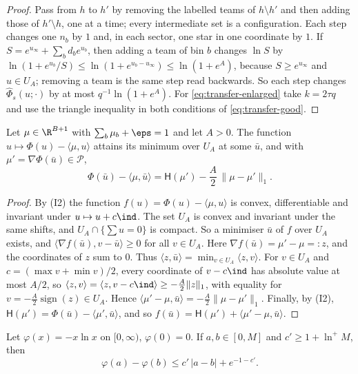 \begin{proof}
Pass from $h$ to $h'$ by removing the labelled teams of $h\setminus h'$ and then adding those
of $h'\setminus h$, one at a time; every intermediate set is a configuration. Each step changes
one $n_b$ by $1$ and, in each sector, one star in one coordinate by $1$. If
$S=e^{u_\infty}+\sum_bd_be^{u_b}$, then adding a team of bin $b$ changes $\ln S$ by
$\ln(1+e^{u_b}/S)\le\ln(1+e^{u_b-u_\infty})\le\ln(1+e^A)$, because $S\ge e^{u_\infty}$ and
$u\in U_A$; removing a team is the same step read backwards. So each step changes
$\widehat\Phi_s(u;\cdot)$ by at most $q^{-1}\ln(1+e^A)$. For \eqref{eq:transfer-enlarged} take
$k=2\tau q$ and use the triangle inequality in both conditions of \eqref{eq:transfer-good}.
\end{proof}

\begin{lemma}\label{lem:transfer-box}
Let $\mu\in\R^{B+1}$ with $\sum_b\mu_b+\eps=1$ and let $A>0$. The function
$u\mapsto\Phi(u)-\langle\mu,u\rangle$ attains its minimum over $U_A$ at some $\bar u$, and with
$\mu'=\nabla\Phi(\bar u)\in\mathcal P$,
\[
\Phi(\bar u)-\langle\mu,\bar u\rangle=\mathsf H(\mu')-\frac A2\,\|\mu-\mu'\|_1 .
\]
\end{lemma}

\begin{proof}
By (I2) the function $f(u)=\Phi(u)-\langle\mu,u\rangle$ is convex, differentiable and
invariant under $u\mapsto u+c\ind$. The set $U_A$ is convex and invariant under the same
shifts, and $U_A\cap\{\sum u=0\}$ is compact. So a minimiser $\bar u$ of $f$ over $U_A$ exists,
and $\langle\nabla f(\bar u),v-\bar u\rangle\ge0$ for all $v\in U_A$. Here
$\nabla f(\bar u)=\mu'-\mu=:z$, and the coordinates of $z$ sum to $0$. Thus
$\langle z,\bar u\rangle=\min_{v\in U_A}\langle z,v\rangle$. For $v\in U_A$ and
$c=(\max v+\min v)/2$, every coordinate of $v-c\ind$ has absolute value at most $A/2$, so
$\langle z,v\rangle=\langle z,v-c\ind\rangle\ge-\tfrac A2\|z\|_1$, with equality for
$v=-\tfrac A2\operatorname{sign}(z)\in U_A$. Hence
$\langle\mu'-\mu,\bar u\rangle=-\tfrac A2\|\mu-\mu'\|_1$. Finally, by (I2),
$\mathsf H(\mu')=\Phi(\bar u)-\langle\mu',\bar u\rangle$, and so
$f(\bar u)=\mathsf H(\mu')+\langle\mu'-\mu,\bar u\rangle$.
\end{proof}

\begin{lemma}\label{lem:transfer-entropy}
Let $\varphi(x)=-x\ln x$ on $[0,\infty)$, $\varphi(0)=0$. If $a,b\in[0,M]$ and
$c'\ge1+\ln^+M$, then
\[
\varphi(a)-\varphi(b)\le c'\,|a-b|+e^{-1-c'}.
\]
\end{lemma}


